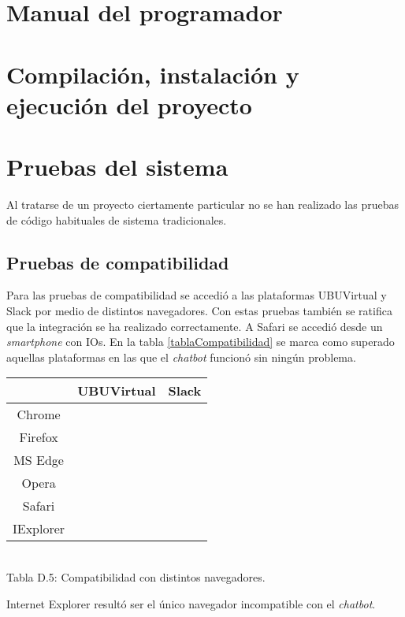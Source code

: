 \section{Manual del programador}

\section{Compilación, instalación y ejecución del proyecto}

\newpage
\section{Pruebas del sistema}

Al tratarse de un proyecto ciertamente particular no se han realizado las pruebas de código habituales de sistema tradicionales.

\subsection{Pruebas de compatibilidad}

Para las pruebas de compatibilidad se accedió a las plataformas UBUVirtual y Slack por medio de distintos navegadores. Con estas pruebas también se ratifica que la integración se ha realizado correctamente.
A Safari se accedió desde un \textit{smartphone} con IOs.
En la tabla \ref{tablaCompatibilidad} se marca como superado aquellas plataformas en las que el \textit{chatbot} funcionó sin ningún problema.

\renewcommand{\arraystretch}{1.2}
	\begin{tabular}{|c|c|c|}  
		\cline{2-3}
		\multicolumn{1}{c|}{} & UBUVirtual & Slack \\
		\hline
		Chrome & \cmark & \cmark \\
		\hline
		Firefox & \cmark & \cmark \\
		\hline
		MS Edge & \cmark & \cmark \\
		\hline
		Opera & \cmark & \cmark \\
		\hline
		Safari & \cmark & \cmark \\
		\hline
		IExplorer & \xmark & \xmark \\
		\hline  
	\end{tabular}\\

Tabla D.5: Compatibilidad con distintos navegadores.
\label{tablaCompatibilidad}

Internet Explorer resultó ser el único navegador incompatible con el \textit{chatbot}.

